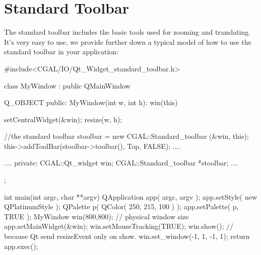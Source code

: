 \section{Standard Toolbar}
\label{Qt_widget_standard_toolbar}

The standard toolbar includes the basic tools used for zooming and translating.
It's very easy to use, we provide further down a typical model of how to use 
the standard toolbar in your application:

\begin{ccExampleCode}
#include<CGAL/IO/Qt_Widget_standard_toolbar.h>

class MyWindow : public QMainWindow
{
  Q_OBJECT
public:
  MyWindow(int w, int h): win(this) {
    setCentralWidget(&win);
    resize(w, h);
    
    //the standard toolbar
    stoolbar = new CGAL::Standard_toolbar (&win, this);
    this->addToolBar(stoolbar->toolbar(), Top, FALSE);
   ....
  }
  ....
private:
  CGAL::Qt_widget         win;
  CGAL::Standard_toolbar  *stoolbar;
  ....
};

int
main(int argc, char **argv)
{
  QApplication app( argc, argv );
    app.setStyle( new QPlatinumStyle );
    QPalette p( QColor( 250, 215, 100 ) );
    app.setPalette( p, TRUE );
  MyWindow win(800,800); // physical window size
  app.setMainWidget(&win);
  win.setMouseTracking(TRUE);
  win.show();
  // because Qt send resizeEvent only on show.
  win.set_window(-1, 1, -1, 1);
  return app.exec();
}
\end{ccExampleCode}










